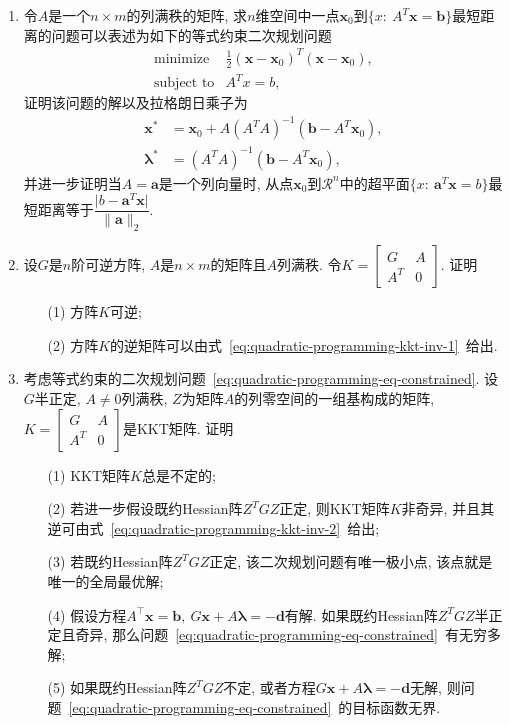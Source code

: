 \documentclass{SBCbookchapter}
\newcommand{\V}[1]{{\bm{#1}}}
\newcommand{\R}{\mathcal{R}}
\numberwithin{equation}{section}
\begin{document}
\begin{enumerate}
\item 令$A$是一个$n \times m$的列满秩的矩阵, 求$n$维空间中一点$\V{x}_0$到$\{ x : ~ A^T \V{x} = \V{b} \}$最短距离的问题可以表述为如下的等式约束二次规划问题
\begin{equation*}
\begin{array}{cl}
\text{minimize} & \frac{1}{2} \left( \V{x} - \V{x}_0 \right)^T \left( \V{x} - \V{x}_0 \right), \\
\text{subject to} & A^T x = b,
\end{array}
\end{equation*}
证明该问题的解以及拉格朗日乘子为
\begin{equation*}
\begin{aligned}
\V{x}^* & = \V{x}_0 + A \left( A^T A \right)^{-1} \left( \V{b} - A^T \V{x}_0 \right), \\
\V{\lambda}^* & = \left( A^T A \right)^{-1} \left( \V{b} - A^T \V{x}_0 \right),
\end{aligned}
\end{equation*}
并进一步证明当$A = \V{a}$是一个列向量时, 从点$\V{x}_0$到$\R^n$中的超平面$\{ x : ~ \V{a}^T \V{x} = b \}$最短距离等于$\dfrac{\lvert b - \V{a}^T \V{x} \rvert}{\lVert \V{a} \rVert_2}.$

\item 设$G$是$n$阶可逆方阵, $A$是$n\times m$的矩阵且$A$列满秩. 令$K = \begin{bmatrix} G & A \\ A^T & 0 \end{bmatrix}.$ 证明
\begin{itemize}
    \item[(1)] 方阵$K$可逆;
    \item[(2)] 方阵$K$的逆矩阵可以由式~\eqref{eq:quadratic-programming-kkt-inv-1}~给出.
\end{itemize}

\item 考虑等式约束的二次规划问题~\eqref{eq:quadratic-programming-eq-constrained}. 设$G$半正定, $A \neq 0$列满秩, $Z$为矩阵$A$的列零空间的一组基构成的矩阵, $K = \begin{bmatrix} G & A \\ A^T & 0 \end{bmatrix}$是KKT矩阵. 证明
\begin{itemize}
    \item[(1)] KKT矩阵$K$总是不定的;
    \item[(2)] 若进一步假设既约Hessian阵$Z^T G Z$正定, 则KKT矩阵$K$非奇异, 并且其逆可由式~\eqref{eq:quadratic-programming-kkt-inv-2}~给出;
    \item[(3)] 若既约Hessian阵$Z^T G Z$正定, 该二次规划问题有唯一极小点, 该点就是唯一的全局最优解;
    \item[(4)] 假设方程$A^⊤ \V{x} = \V{b}, ~ G \V{x} + A \V{\lambda} = − \V{d}$有解. 如果既约Hessian阵$Z^T G Z$半正定且奇异, 那么问题~\eqref{eq:quadratic-programming-eq-constrained}~有无穷多解;
    \item[(5)] 如果既约Hessian阵$Z^T G Z$不定, 或者方程$G \V{x} + A \V{\lambda} = − \V{d}$无解, 则问题~\eqref{eq:quadratic-programming-eq-constrained}~的目标函数无界.
\end{itemize}


\end{enumerate}
\end{document}

